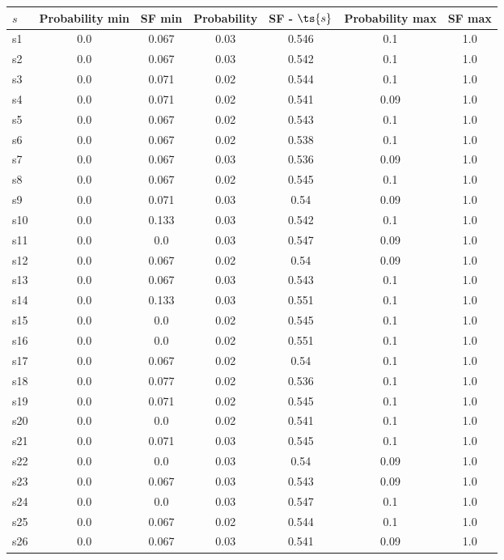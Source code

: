 \documentclass{article}
\begin{document}
\noindent\begin{tabular}{|l|c|c|c|c|c|c|}
\hline
$s$& Probability min & SF min & Probability & SF - $\ts{s}$ & Probability max & SF max\\
\hline
s1 &0.0 & 0.067 & 0.03 & 0.546 & 0.1 & 1.0\\
\hline
s2 &0.0 & 0.067 & 0.03 & 0.542 & 0.1 & 1.0\\
\hline
s3 &0.0 & 0.071 & 0.02 & 0.544 & 0.1 & 1.0\\
\hline
s4 &0.0 & 0.071 & 0.02 & 0.541 & 0.09 & 1.0\\
\hline
s5 &0.0 & 0.067 & 0.02 & 0.543 & 0.1 & 1.0\\
\hline
s6 &0.0 & 0.067 & 0.02 & 0.538 & 0.1 & 1.0\\
\hline
s7 &0.0 & 0.067 & 0.03 & 0.536 & 0.09 & 1.0\\
\hline
s8 &0.0 & 0.067 & 0.02 & 0.545 & 0.1 & 1.0\\
\hline
s9 &0.0 & 0.071 & 0.03 & 0.54 & 0.09 & 1.0\\
\hline
s10 &0.0 & 0.133 & 0.03 & 0.542 & 0.1 & 1.0\\
\hline
s11 &0.0 & 0.0 & 0.03 & 0.547 & 0.09 & 1.0\\
\hline
s12 &0.0 & 0.067 & 0.02 & 0.54 & 0.09 & 1.0\\
\hline
s13 &0.0 & 0.067 & 0.03 & 0.543 & 0.1 & 1.0\\
\hline
s14 &0.0 & 0.133 & 0.03 & 0.551 & 0.1 & 1.0\\
\hline
s15 &0.0 & 0.0 & 0.02 & 0.545 & 0.1 & 1.0\\
\hline
s16 &0.0 & 0.0 & 0.02 & 0.551 & 0.1 & 1.0\\
\hline
s17 &0.0 & 0.067 & 0.02 & 0.54 & 0.1 & 1.0\\
\hline
s18 &0.0 & 0.077 & 0.02 & 0.536 & 0.1 & 1.0\\
\hline
s19 &0.0 & 0.071 & 0.02 & 0.545 & 0.1 & 1.0\\
\hline
s20 &0.0 & 0.0 & 0.02 & 0.541 & 0.1 & 1.0\\
\hline
s21 &0.0 & 0.071 & 0.03 & 0.545 & 0.1 & 1.0\\
\hline
s22 &0.0 & 0.0 & 0.03 & 0.54 & 0.09 & 1.0\\
\hline
s23 &0.0 & 0.067 & 0.03 & 0.543 & 0.09 & 1.0\\
\hline
s24 &0.0 & 0.0 & 0.03 & 0.547 & 0.1 & 1.0\\
\hline
s25 &0.0 & 0.067 & 0.02 & 0.544 & 0.1 & 1.0\\
\hline
s26 &0.0 & 0.067 & 0.03 & 0.541 & 0.09 & 1.0\\

\end{tabular}
\end{document}
